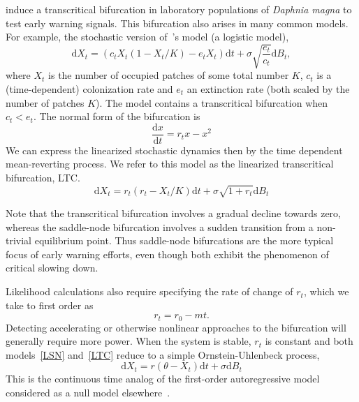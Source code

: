 \documentclass[authoryear,preprint,11pt]{elsarticle}
\newcommand{\ud}{\mathrm{d}}
\begin{document}
\citet{Drake2010} induce a transcritical bifurcation in laboratory populations of \emph{Daphnia magna} to test early warning signals.  
This bifurcation also arises in many common models.  For example, the stochastic version of~\citet{Levins1969}'s model (a logistic model),
\begin{equation}
\ud X_t = \left( c_t X_t (1-X_t/K) - e_t X_t \right) \ud t + \sigma \sqrt{\frac{e_t}{c_t}} \ud B_t \label{levins},
\end{equation}
where $X_t$ is the number of occupied patches of some total number $K$, $c_t$ is a (time-dependent)
colonization rate and $e_t$ an extinction rate (both scaled by the number of patches $K$).  
The model contains a transcritical bifurcation when $c_t < e_t$.  The normal form of the bifurcation is
\begin{equation}
\frac{\ud x}{\ud t} = r_t x - x^2 
\label{transcritical}
\end{equation}
We can express the linearized stochastic dynamics then by the time dependent mean-reverting process. 
We refer to this model as the linearized transcritical bifurcation, LTC.  
\begin{equation}
\ud X_t = r_t (r_t - X_t/K) \ud t + \sigma \sqrt{1+r_t} \ud B_t \label{LTC}
\end{equation}

Note that the transcritical bifurcation involves a gradual decline towards zero,
whereas the saddle-node bifurcation involves a sudden transition from a non-trivial equilibrium point.
Thus saddle-node bifurcations are the more typical focus of early warning efforts, even though both exhibit the phenomenon of critical slowing down.

Likelihood calculations also require specifying the rate of change of $r_t$, 
which we take to first order as
\begin{equation}
r_t = r_0 - m t.
\label{R_t}
\end{equation}
Detecting accelerating or otherwise nonlinear approaches to the bifurcation will generally require more power. When the system is stable, $r_t$ is constant and both models~\eqref{LSN} and~\eqref{LTC} reduce to a simple Ornstein-Uhlenbeck process, 
\begin{equation}
\ud X_t = r (\theta - X_t) \ud t + \sigma \ud B_t \label{OU}
\end{equation}
This is the continuous time analog of the first-order autoregressive model considered as a null model elsewhere~\citep[\emph{e.g.}][]{Dakos2008, Guttal2008a}. 
\end{document}
